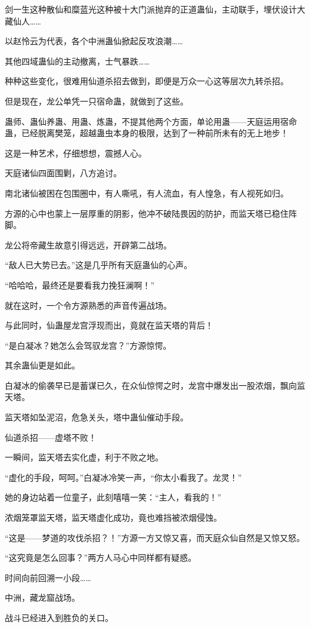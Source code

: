 \begin{this_body}
剑一生这种散仙和糜蓝光这种被十大门派抛弃的正道蛊仙，主动联手，埋伏设计大藏仙人……

以赵怜云为代表，各个中洲蛊仙掀起反攻浪潮……

其他四域蛊仙的主动撤离，士气暴跌……

种种这些变化，很难用仙道杀招去做到，即便是万众一心这等层次九转杀招。

但是现在，龙公单凭一只宿命蛊，就做到了这些。

蛊师、蛊仙养蛊、用蛊、炼蛊，不提其他两个方面，单论用蛊——天庭运用宿命蛊，已经脱离樊笼，超越蛊虫本身的极限，达到了一种前所未有的无上地步！

这是一种艺术，仔细想想，震撼人心。

天庭诸仙四面围剿，八方追讨。

南北诸仙被困在包围圈中，有人嘶吼，有人流血，有人惶急，有人视死如归。

方源的心中也蒙上一层厚重的阴影，他冲不破陆畏因的防护，而监天塔已稳住阵脚。

龙公将帝藏生故意引得远远，开辟第二战场。

“敌人已大势已去。”这是几乎所有天庭蛊仙的心声。

“哈哈哈，最终还是要看我力挽狂澜啊！”

就在这时，一个令方源熟悉的声音传遍战场。

与此同时，仙蛊屋龙宫浮现而出，竟就在监天塔的背后！

“是白凝冰？她怎么会驾驭龙宫？”方源惊愕。

其余蛊仙更是如此。

白凝冰的偷袭早已是蓄谋已久，在众仙惊愕之时，龙宫中爆发出一股浓烟，飘向监天塔。

监天塔如坠泥沼，危急关头，塔中蛊仙催动手段。

仙道杀招——虚塔不败！

一瞬间，监天塔去实化虚，利于不败之地。

“虚化的手段，呵呵。”白凝冰冷笑一声，“你太小看我了。龙灵！”

她的身边站着一位童子，此刻嘻嘻一笑：“主人，看我的！”

浓烟笼罩监天塔，监天塔虚化成功，竟也难挡被浓烟侵蚀。

“这是——梦道的攻伐杀招？！”方源一方又惊又喜，而天庭众仙自然是又惊又怒。

“这究竟是怎么回事？”两方人马心中同样都有疑惑。

时间向前回溯一小段……

中洲，藏龙窟战场。

战斗已经进入到胜负的关口。


\end{this_body}
